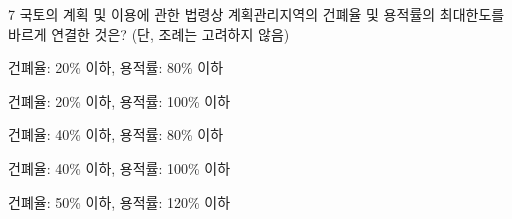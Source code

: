 \begin{question}{7}
국토의 계획 및 이용에 관한 법령상 계획관리지역의 건폐율 및 용적률의 최대한도를 바르게 연결한 것은? (단, 조례는 고려하지 않음)
\begin{choices}
  \item 건폐율: 20\% 이하, 용적률: 80\% 이하
  \item 건폐율: 20\% 이하, 용적률: 100\% 이하
  \item 건폐율: 40\% 이하, 용적률: 80\% 이하
  \item 건폐율: 40\% 이하, 용적률: 100\% 이하
  \item 건폐율: 50\% 이하, 용적률: 120\% 이하
\end{choices}
\end{question}
